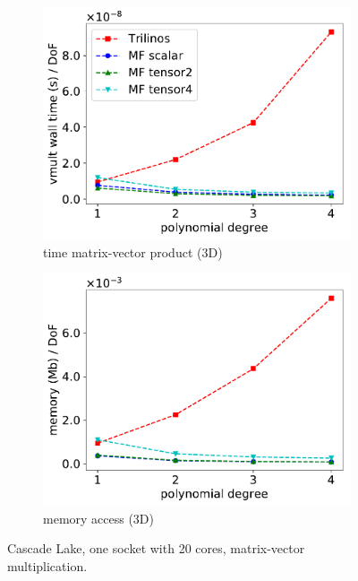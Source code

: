 \documentclass[AMA,STIX1COL]{WileyNJD-v2}
\begin{document}
\begin{figure}
\begin{subfigure}[b]{0.32\textwidth}
    \includegraphics[width=\textwidth]{CSL_Munich_timing3d.pdf}
    \caption{time matrix-vector product (3D)}
    \label{fig:benchmark_miehe_CSL_vmult3}
  \end{subfigure}
  \begin{subfigure}[b]{0.32\textwidth}
    \centering
    \includegraphics[width=\textwidth]{CSL_Munich_memory3d.pdf}
    \caption{memory access (3D)}
    \label{fig:benchmark_miehe_CSL_memory3}
  \end{subfigure}
  \caption{Cascade Lake, one socket with 20 cores, matrix-vector multiplication.}%
  \label{fig:benchmark_miehe_CSL}
\end{figure}
\end{document}
